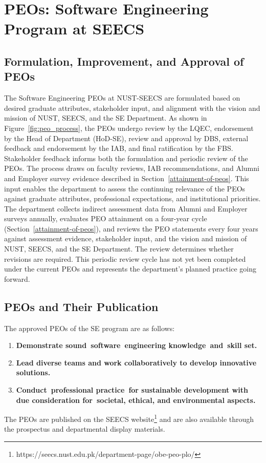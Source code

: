 \hypertarget{peo-se}{%
\section{PEOs: Software Engineering Program at SEECS}\label{peo-se}}

\subsection{Formulation, Improvement, and Approval of PEOs} \label{sec:peo_process} 

The Software Engineering PEOs at NUST-SEECS are formulated based on desired graduate attributes, stakeholder input, and alignment with the vision and mission of NUST, SEECS, and the SE Department. As shown in Figure~\ref{fig:peo_process}, the PEOs undergo review by the LQEC, endorsement by the Head of Department (HoD-SE), review and approval by DBS, external feedback and endorsement by the IAB, and final ratification by the FBS. Stakeholder feedback informs both the formulation and periodic review of the PEOs. The process draws on faculty reviews, IAB recommendations, and Alumni and Employer survey evidence described in Section~\ref{attainment-of-peos}. This input enables the department to assess the continuing relevance of the PEOs against graduate attributes, professional expectations, and institutional priorities. The department collects indirect assessment data from Alumni and Employer surveys annually, evaluates PEO attainment on a four-year cycle (Section~\ref{attainment-of-peos}), and reviews the PEO statements every four years against assessment evidence, stakeholder input, and the vision and mission of NUST, SEECS, and the SE Department. The review determines whether revisions are required. This periodic review cycle has not yet been completed under the current PEOs and represents the department's planned practice going forward.

\subsection{PEOs and Their Publication} \label{sec:peo_publication} The approved PEOs of the SE program are as follows: 
\begin{enumerate} 
\item \textbf{Demonstrate sound~software~engineering knowledge~and~skill set.} 
\item \textbf{Lead diverse teams and work collaboratively to develop innovative solutions. }
\item \textbf{Conduct~professional practice~for sustainable development with due consideration for~societal, ethical, and environmental aspects.} 
\end{enumerate} 
The PEOs are published on the SEECS website\footnote{https://seecs.nust.edu.pk/department-page/obe-peo-plo/} and are also available through the prospectus and departmental display materials.

